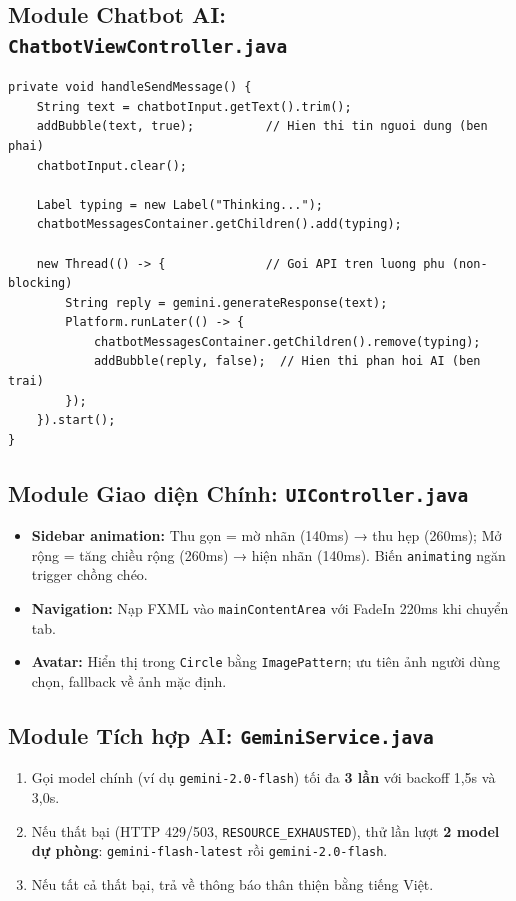 \documentclass[12pt, a4paper, oneside]{report}
\newcommand{\code}[1]{\texttt{\color{hustblue!80!black}#1}}
\begin{document}
\subsection{Module Chatbot AI: \texttt{ChatbotViewController.java}}

\begin{lstlisting}[caption={Luồng xử lý câu hỏi chatbot cá nhân},
                   label=lst:chatbot, style=javastyle]
private void handleSendMessage() {
    String text = chatbotInput.getText().trim();
    addBubble(text, true);          // Hien thi tin nguoi dung (ben phai)
    chatbotInput.clear();

    Label typing = new Label("Thinking...");
    chatbotMessagesContainer.getChildren().add(typing);

    new Thread(() -> {              // Goi API tren luong phu (non-blocking)
        String reply = gemini.generateResponse(text);
        Platform.runLater(() -> {
            chatbotMessagesContainer.getChildren().remove(typing);
            addBubble(reply, false);  // Hien thi phan hoi AI (ben trai)
        });
    }).start();
}
\end{lstlisting}

\subsection{Module Giao diện Chính: \texttt{UIController.java}}

\begin{itemize}[leftmargin=2em, itemsep=4pt]
  \item \textbf{Sidebar animation:} Thu gọn = mờ nhãn (140ms) → thu hẹp
    (260ms); Mở rộng = tăng chiều rộng (260ms) → hiện nhãn (140ms).
    Biến \code{animating} ngăn trigger chồng chéo.
  \item \textbf{Navigation:} Nạp FXML vào \code{mainContentArea} với
    FadeIn 220ms khi chuyển tab.
  \item \textbf{Avatar:} Hiển thị trong \code{Circle} bằng \code{ImagePattern};
    ưu tiên ảnh người dùng chọn, fallback về ảnh mặc định.
\end{itemize}

\subsection{Module Tích hợp AI: \texttt{GeminiService.java}}

\begin{tcolorbox}[infostyle, title={Chiến lược xử lý lỗi phân tầng}]
\begin{enumerate}[leftmargin=1.5em, itemsep=4pt]
  \item Gọi model chính (ví dụ \code{gemini-2.0-flash}) tối đa \textbf{3 lần}
    với backoff 1,5s và 3,0s.
  \item Nếu thất bại (HTTP 429/503, \code{RESOURCE\_EXHAUSTED}), thử lần lượt
    \textbf{2 model dự phòng}: \code{gemini-flash-latest} rồi \code{gemini-2.0-flash}.
  \item Nếu tất cả thất bại, trả về thông báo thân thiện bằng tiếng Việt.
\end{enumerate}
\end{tcolorbox}
\end{document}
